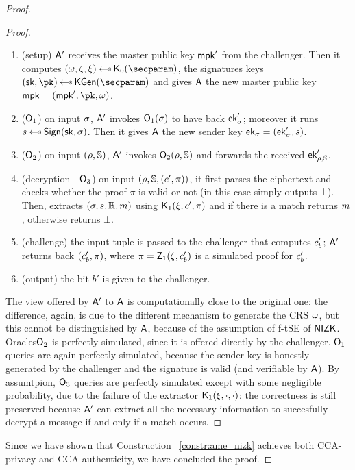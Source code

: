 \begin{theorem}
\begin{proof}
\begin{lemma}
\begin{proof}
                \begin{enumerate}
                    \item (setup) $\mathsf{A}'$ receives the master public key $\mathsf{mpk}'$ from the challenger. Then it computes $(\crs,\tpsim,\tpext)\getsr\nizkext_0(\secparam)$, the signatures keys $(\sk, \pk) \getsr \kgen(\secparam)$ and gives $\mathsf{A}$ the new master public key $\mpk = (\mpk', \pk, \crs)$.
                    \item ($\mathsf{O}_1$) on input $\sigma$, $\mathsf{A}'$ invokes $\mathsf{O}_1(\sigma)$ to have back $\mathsf{ek}'_\sigma$; moreover it runs $\signature \getsr \sign(\sk, \sattr)$. Then it gives $\mathsf{A}$ the new sender key $\mathsf{ek}_\sigma = (\mathsf{ek}'_\sigma, s)$.
                    \item ($\mathsf{O}_2$) on input $(\rho, \mathbb{S})$, $\mathsf{A}'$ invokes $\mathsf{O}_2(\rho, \mathbb{S})$ and forwards the received $\mathsf{ek}'_{\rho, \mathbb{S}}$.
                    \item (decryption - $\mathsf{O}_3$) on input $(\rho, \mathbb{S}, (c', \pi))$, it first parses the ciphertext and checks whether the proof $\pi$ is valid or not (in this case simply outputs $\bot$). Then, extracts $(\sigma, s, \mathbb{R}, m)$ using $\mathsf{K}_1(\xi,c',\pi)$ and if there is a match returns $m$, otherwise returns $\bot$.
                    \item (challenge) the input tuple is passed to the challenger that computes $c'_b$; $\mathsf{A}'$ returns back $(c'_b, \pi)$, where $\pi = \mathsf{Z}_1(\zeta, c'_b)$ is a simulated proof for $c'_b$.
                    \item (output) the bit $b'$ is given to the challenger.
                \end{enumerate}

                The view offered by $\mathsf{A}'$ to $\mathsf{A}$ is computationally close to the original one: the difference, again, is due to the different mechanism to generate the CRS $\omega$, but this cannot be distinguished by $\mathsf{A}$, because of the assumption of f-tSE of $\mathsf{NIZK}$.
                Oracles$\mathsf{O}_2$ is perfectly simulated, since it is offered directly by the challenger.
                $\mathsf{O}_1$ queries are again perfectly simulated, because the sender key is honestly generated by the challenger and the signature is valid (and verifiable by $\mathsf{A}$).
                By assumtpion, $\mathsf{O}_3$ queries are perfectly simulated except with some negligible probability, due to the failure of the extractor $\mathsf{K}_1(\xi, \cdot, \cdot)$: the correctness is still preserved because $\mathsf{A}'$ can extract all the necessary information to succesfully decrypt a message if and only if a match occurs.
            \end{proof}
        \end{lemma}
        Since we have shown that Construction ~\ref{constr:ame_nizk} achieves both CCA-privacy and CCA-authenticity, we have concluded the proof.
    \end{proof}
\end{theorem}